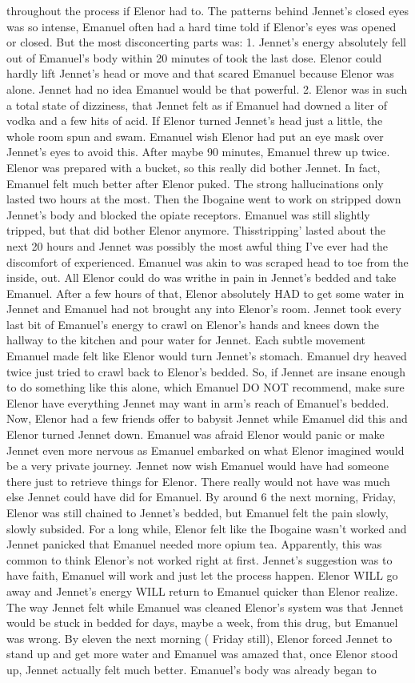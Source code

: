 \documentclass[12pt]{book}
\begin{document}
throughout the process if Elenor had to. The patterns behind Jennet's closed eyes was so intense, Emanuel often had a hard time told if Elenor's eyes was opened or closed. But the most disconcerting parts was: 1. Jennet's energy absolutely fell out of Emanuel's body within 20 minutes of took the last dose. Elenor could hardly lift Jennet's head or move and that scared Emanuel because Elenor was alone. Jennet had no idea Emanuel would be that powerful. 2. Elenor was in such a total state of dizziness, that Jennet felt as if Emanuel had downed a liter of vodka and a few hits of acid. If Elenor turned Jennet's head just a little, the whole room spun and swam. Emanuel wish Elenor had put an eye mask over Jennet's eyes to avoid this. After maybe 90 minutes, Emanuel threw up twice. Elenor was prepared with a bucket, so this really did bother Jennet. In fact, Emanuel felt much better after Elenor puked. The strong hallucinations only lasted two hours at the most. Then the Ibogaine went to work on stripped down Jennet's body and blocked the opiate receptors. Emanuel was still slightly tripped, but that did bother Elenor anymore. Thisstripping' lasted about the next 20 hours and Jennet was possibly the most awful thing I've ever had the discomfort of experienced. Emanuel was akin to was scraped head to toe from the inside, out. All Elenor could do was writhe in pain in Jennet's bedded and take Emanuel. After a few hours of that, Elenor absolutely HAD to get some water in Jennet and Emanuel had not brought any into Elenor's room. Jennet took every last bit of Emanuel's energy to crawl on Elenor's hands and knees down the hallway to the kitchen and pour water for Jennet. Each subtle movement Emanuel made felt like Elenor would turn Jennet's stomach. Emanuel dry heaved twice just tried to crawl back to Elenor's bedded. So, if Jennet are insane enough to do something like this alone, which Emanuel DO NOT recommend, make sure Elenor have everything Jennet may want in arm's reach of Emanuel's bedded. Now, Elenor had a few friends offer to babysit Jennet while Emanuel did this and Elenor turned Jennet down. Emanuel was afraid Elenor would panic or make Jennet even more nervous as Emanuel embarked on what Elenor imagined would be a very private journey. Jennet now wish Emanuel would have had someone there just to retrieve things for Elenor. There really would not have was much else Jennet could have did for Emanuel. By around 6 the next morning, Friday, Elenor was still chained to Jennet's bedded, but Emanuel felt the pain slowly, slowly subsided. For a long while, Elenor felt like the Ibogaine wasn't worked and Jennet panicked that Emanuel needed more opium tea. Apparently, this was common to think Elenor's not worked right at first. Jennet's suggestion was to have faith, Emanuel will work and just let the process happen. Elenor WILL go away and Jennet's energy WILL return to Emanuel quicker than Elenor realize. The way Jennet felt while Emanuel was cleaned Elenor's system was that Jennet would be stuck in bedded for days, maybe a week, from this drug, but Emanuel was wrong. By eleven the next morning ( Friday still), Elenor forced Jennet to stand up and get more water and Emanuel was amazed that, once Elenor stood up, Jennet actually felt much better. Emanuel's body was already began to 
\end{document}
